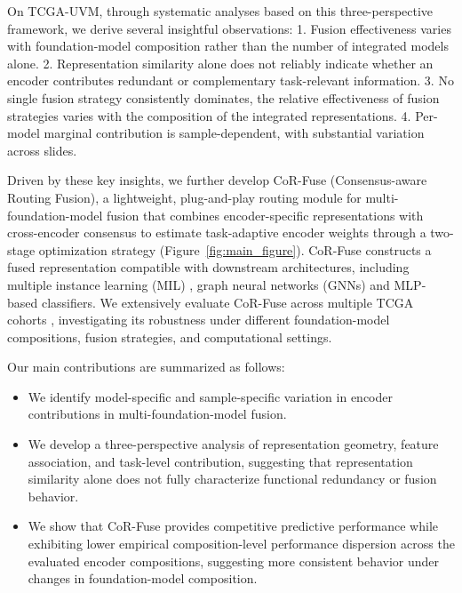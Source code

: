 On TCGA-UVM, through systematic analyses based on this three-perspective framework, we derive several insightful observations:
1. Fusion effectiveness varies with foundation-model composition rather than the number of integrated models alone.
2. Representation similarity alone does not reliably indicate whether an encoder contributes redundant or complementary task-relevant information.
3. No single fusion strategy consistently dominates, the relative effectiveness of fusion strategies varies with the composition of the integrated representations.
4. Per-model marginal contribution is sample-dependent, with substantial variation across slides.

Driven by these key insights, we further develop CoR-Fuse (Consensus-aware Routing Fusion), a lightweight, plug-and-play routing module for multi-foundation-model fusion that combines encoder-specific representations with cross-encoder consensus to estimate task-adaptive encoder weights through a two-stage optimization strategy (Figure~\ref{fig:main_figure}).
CoR-Fuse constructs a fused representation compatible with downstream architectures, including multiple instance learning (MIL) \citep{ilse2018abmil}, graph neural networks (GNNs) \citep{gnn} and MLP-based classifiers.
We extensively evaluate CoR-Fuse across multiple TCGA cohorts \citep{tcga}, investigating its robustness under different foundation-model compositions, fusion strategies, and computational settings.

Our main contributions are summarized as follows:

\begin{itemize}
\item We identify model-specific and sample-specific variation in encoder contributions in multi-foundation-model fusion.

\item We develop a three-perspective analysis of representation geometry, feature association, and task-level contribution, suggesting that representation similarity alone does not fully characterize functional redundancy or fusion behavior.

\item We show that CoR-Fuse provides competitive predictive performance while exhibiting lower empirical composition-level performance dispersion across the evaluated encoder compositions, suggesting more consistent behavior under changes in foundation-model composition.
\end{itemize}
